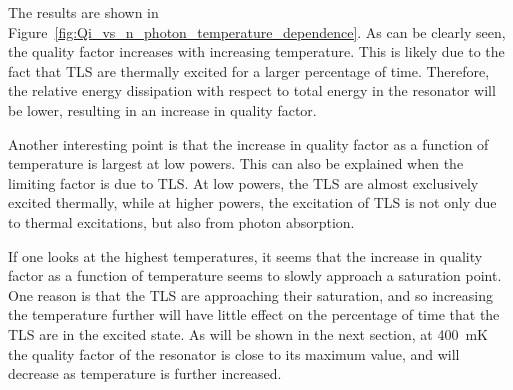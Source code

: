 The results are shown in Figure~\ref{fig:Qi_vs_n_photon_temperature_dependence}. As can be clearly seen, the quality factor increases with increasing temperature. This is likely due to the fact that TLS are thermally excited for a larger percentage of time. Therefore, the relative energy dissipation with respect to total energy in the resonator will be lower, resulting in an increase in quality factor.

Another interesting point is that the increase in quality factor as a function of temperature is largest at low powers. This can also be explained when the limiting factor is due to TLS. At low powers, the TLS are almost exclusively excited thermally, while at higher powers, the excitation of TLS is not only due to thermal excitations, but also from photon absorption.

If one looks at the highest temperatures, it seems that the increase in quality factor as a function of temperature seems to slowly approach a saturation point. One reason is that the TLS are approaching their saturation, and so increasing the temperature further will have little effect on the percentage of time that the TLS are in the excited state. As will be shown in the next section, at \SI{400}{\milli \kelvin} the quality factor of the resonator is close to its maximum value, and will decrease as temperature is further increased.



